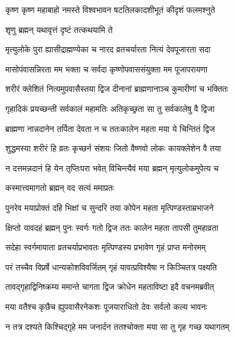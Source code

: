 \twolineshloka
{कृष्ण कृष्ण महाबाहो नमस्ते विश्वभावन}
{षटतिलकादशीभूतं कीदृशं फलमश्नुते} %



\onelineshloka
{शृणु ब्रह्मन् यथावृत्तं दृष्टं तत्कथयामि ते} %

\twolineshloka
{मृत्युलोके पुरा ह्यासीद्राह्मण्येका च नारद}
{व्रतचर्यारता नित्यं देवपूजारता सदा} %

\twolineshloka
{मासोपंवासन्निरता मम भक्ता च सर्वदा}
{कृष्णोपवाससंयुक्ता मम पूजापरायणा} %

\twolineshloka
{शरीरं क्लेशितं नित्यमुपवासैस्तया द्विज}
{दीनानां ब्राह्मणानाञ्च कुमारीणां च भक्तितः} %

\twolineshloka
{गृहादिकं प्रयच्छन्ती सर्वकालं महामतिः}
{अतिकृच्छ्रता सा तु सर्वकालेषु वै द्विजा} %

\twolineshloka
{ब्राह्मणा नान्नदानेन तर्पिता देवता न च}
{ततःकालेन महता मया ये चिन्तितं द्विज} %

\twolineshloka
{शुद्धमस्या शरीरं हि व्रतः कृच्छर्न संशयः}
{जितो वैष्णवो लोकः कायक्लेशेन वै तया} %

\twolineshloka
{न दत्तमन्नदानं हि येन तृप्तिःपरा भवेत्}
{विचिन्त्यैवं मया ब्रह्मन् मृत्युलोकमुपेत्य च} %



\onelineshloka
{कस्मात्त्वमागतो ब्रह्मन् वद सत्यं ममाप्रतः} %

\twolineshloka
{पुनरेव मयाप्रोक्तं दहि भिक्षां च सुन्दरि}
{तया कोपेन महता मृत्पिण्डस्ताम्रभाजने} %

\twolineshloka
{क्षिप्तो यावदहं ब्रह्मन् पुनः स्वर्गः गतो द्विज}
{ततः कालेन महता तापसी तुमहाव्रता} %

\twolineshloka
{सदेहा स्वर्गमायाता व्रतचर्याप्रभावतः}
{मृत्पिण्डस्य प्रभावेण गृहं प्राप्त मनोरमम्} %

\twolineshloka
{परं तच्चैव विप्रर्षे धान्यकोशविवर्जितम्}
{गृहं यावत्प्रविश्यैषा न किञ्चितत्र पक्ष्यति} %

\twolineshloka
{तावद्गृहाद्विनिष्क्रम्य ममान्ते चागता द्विज}
{क्रोधेन महताविष्टा इदै वचनमब्रवीत्} %

\twolineshloka
{मया वतैश्च कृछैच ह्युपवासैरनेकशः}
{पूजयाराधितो देवः सर्वलो कल्य भावनः} %

\twolineshloka
{न तत्र दश्यते किश्चिद्गृहे मम जनार्दन}
{ततश्चोक्ता मया सा तु गृह गच्छ यथागतम्} %

